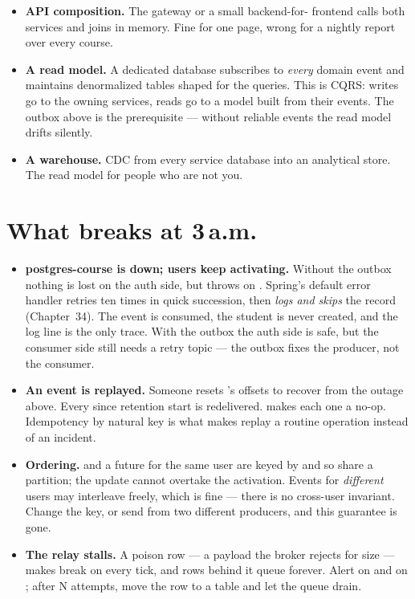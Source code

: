 \begin{itemize}
  \item \textbf{API composition.} The gateway or a small backend-for-
  frontend calls both services and joins in memory. Fine for one page,
  wrong for a nightly report over every course.
  \item \textbf{A read model.} A dedicated  database
  subscribes to \emph{every} domain event and maintains denormalized
  tables shaped for the queries. This is CQRS: writes go to the owning
  services, reads go to a model built from their events. The outbox
  above is the prerequisite --- without reliable events the read model
  drifts silently.
  \item \textbf{A warehouse.} CDC from every service database into an
  analytical store. The read model for people who are not you.
\end{itemize}

\section{What breaks at 3\,a.m.}

\begin{itemize}
  \item \textbf{postgres-course is down; users keep activating.}
  Without the outbox nothing is lost on the auth side, but
   throws on . Spring's default
  error handler retries ten times in quick succession, then \emph{logs
  and skips} the record (Chapter~34). The event is consumed, the
  student is never created, and the log line is the only trace. With
  the outbox the auth side is safe, but the consumer side still needs a
  retry topic --- the outbox fixes the producer, not the consumer.
  \item \textbf{An event is replayed.} Someone resets
  's offsets to recover from the outage above. Every
   since retention start is redelivered.
   makes each one a no-op. Idempotency
  by natural key is what makes replay a routine operation instead of an
  incident.
  \item \textbf{Ordering.}  and a future
   for the same user are keyed by  and so
  share a partition; the update cannot overtake the activation. Events
  for \emph{different} users may interleave freely, which is fine ---
  there is no cross-user invariant. Change the key, or send from two
  different producers, and this guarantee is gone.
  \item \textbf{The relay stalls.} A poison row --- a payload the broker
  rejects for size --- makes  break on every tick, and rows behind
  it queue forever. Alert on  and on
  ; after N attempts, move
  the row to a  table and let the queue drain.
\end{itemize}

